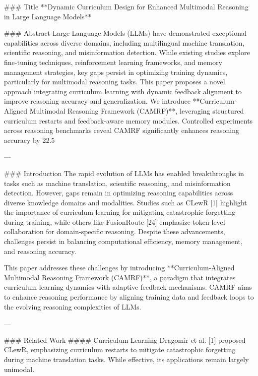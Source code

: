 ### Title  
**Dynamic Curriculum Design for Enhanced Multimodal Reasoning in Large Language Models**

### Abstract  
Large Language Models (LLMs) have demonstrated exceptional capabilities across diverse domains, including multilingual machine translation, scientific reasoning, and misinformation detection. While existing studies explore fine-tuning techniques, reinforcement learning frameworks, and memory management strategies, key gaps persist in optimizing training dynamics, particularly for multimodal reasoning tasks. This paper proposes a novel approach integrating curriculum learning with dynamic feedback alignment to improve reasoning accuracy and generalization. We introduce **Curriculum-Aligned Multimodal Reasoning Framework (CAMRF)**, leveraging structured curriculum restarts and feedback-aware memory modules. Controlled experiments across reasoning benchmarks reveal CAMRF significantly enhances reasoning accuracy by 22.5%

---

### Introduction  
The rapid evolution of LLMs has enabled breakthroughs in tasks such as machine translation, scientific reasoning, and misinformation detection. However, gaps remain in optimizing reasoning capabilities across diverse knowledge domains and modalities. Studies such as CLewR [1] highlight the importance of curriculum learning for mitigating catastrophic forgetting during training, while others like FusionRoute [24] emphasize token-level collaboration for domain-specific reasoning. Despite these advancements, challenges persist in balancing computational efficiency, memory management, and reasoning accuracy.  

This paper addresses these challenges by introducing **Curriculum-Aligned Multimodal Reasoning Framework (CAMRF)**, a paradigm that integrates curriculum learning dynamics with adaptive feedback mechanisms. CAMRF aims to enhance reasoning performance by aligning training data and feedback loops to the evolving reasoning complexities of LLMs.  

---

### Related Work  
#### Curriculum Learning  
Dragomir et al. [1] proposed CLewR, emphasizing curriculum restarts to mitigate catastrophic forgetting during machine translation tasks. While effective, its applications remain largely unimodal.  

